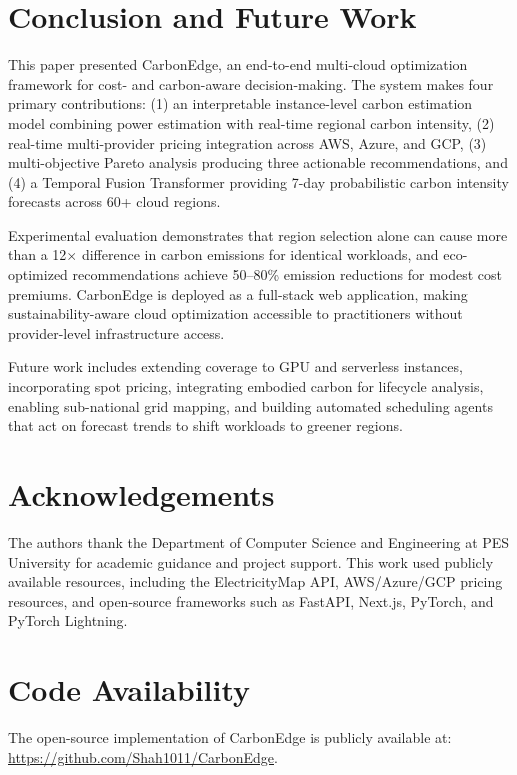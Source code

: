 \documentclass[12pt]{article}
\begin{document}
\section{Conclusion and Future Work}
This paper presented CarbonEdge, an end-to-end multi-cloud optimization framework for cost- and carbon-aware decision-making. The system makes four primary contributions: (1) an interpretable instance-level carbon estimation model combining power estimation with real-time regional carbon intensity, (2) real-time multi-provider pricing integration across AWS, Azure, and GCP, (3) multi-objective Pareto analysis producing three actionable recommendations, and (4) a Temporal Fusion Transformer providing 7-day probabilistic carbon intensity forecasts across 60+ cloud regions.

Experimental evaluation demonstrates that region selection alone can cause more than a 12$\times$ difference in carbon emissions for identical workloads, and eco-optimized recommendations achieve 50--80\% emission reductions for modest cost premiums. CarbonEdge is deployed as a full-stack web application, making sustainability-aware cloud optimization accessible to practitioners without provider-level infrastructure access.

Future work includes extending coverage to GPU and serverless instances, incorporating spot pricing, integrating embodied carbon for lifecycle analysis, enabling sub-national grid mapping, and building automated scheduling agents that act on forecast trends to shift workloads to greener regions.

\section*{Acknowledgements}
The authors thank the Department of Computer Science and Engineering at PES University for academic guidance and project support. This work used publicly available resources, including the ElectricityMap API, AWS/Azure/GCP pricing resources, and open-source frameworks such as FastAPI, Next.js, PyTorch, and PyTorch Lightning.

\section*{Code Availability}
The open-source implementation of CarbonEdge is publicly available at: \url{https://github.com/Shah1011/CarbonEdge}.
\end{document}
